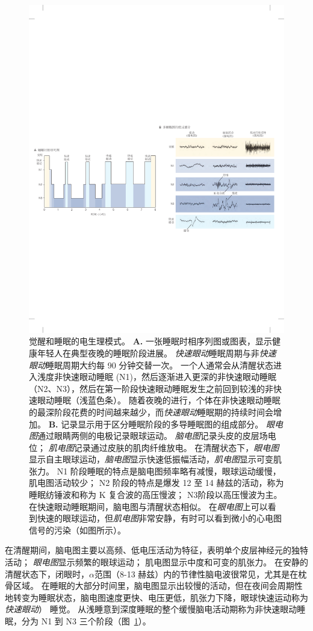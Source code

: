 \begin{figure}[htbp]
	\centering
	\includegraphics[width=0.7\linewidth]{chap44/fig_44_1}
	\caption{觉醒和睡眠的电生理模式。
		\textbf{A.} 一张睡眠时相序列图或图表，显示健康年轻人在典型夜晚的睡眠阶段进展。
		\textit{快速眼动}睡眠周期与非\textit{快速眼动}睡眠周期大约每 90 分钟交替一次。
		一个人通常会从清醒状态进入浅度非快速眼动睡眠 (N1)，然后逐渐进入更深的非快速眼动睡眠（N2、N3），然后在第一阶段快速眼动睡眠发生之前回到较浅的非快速眼动睡眠（浅蓝色条）。
		随着夜晚的进行，个体在非快速眼动睡眠的最深阶段花费的时间越来越少，而\textit{快速眼动}睡眠期的持续时间会增加。
		\textbf{B.} 记录显示用于区分睡眠阶段的多导睡眠图的组成部分。
		\textit{眼电图}通过眼睛两侧的电极记录眼球运动。
		\textit{脑电图}记录头皮的皮层场电位； \textit{肌电图}记录通过皮肤的肌肉纤维放电。
		在清醒状态下，\textit{眼电图}显示自主眼球运动，\textit{脑电图}显示快速低振幅活动，\textit{肌电图}显示可变肌张力。
		N1 阶段睡眠的特点是脑电图频率略有减慢，眼球运动缓慢，肌电图活动较少；
		N2 阶段的特点是爆发 12 至 14 赫兹的活动，称为睡眠纺锤波和称为 K 复合波的高压慢波；
		N3阶段以高压慢波为主。
		在快速眼动睡眠期间，脑电图与清醒状态相似。
		在\textit{眼电图}上可以看到快速的眼球运动，但\textit{肌电图}非常安静，有时可以看到微小的心电图信号的污染（如图所示）。}
	\label{fig:44_1}
\end{figure}


在清醒期间，脑电图主要以高频、低电压活动为特征，表明单个皮层神经元的独特活动；
\textit{眼电图}显示频繁的眼球运动；
肌电图显示中度和可变的肌张力。
在安静的清醒状态下，闭眼时，$ \alpha $范围（8-13 赫兹）内的节律性脑电波很常见，尤其是在枕骨区域。
在睡眠的大部分时间里，脑电图显示出较慢的活动，但在夜间会周期性地转变为睡眠状态，脑电图速度更快、电压更低，肌张力下降，眼球快速运动称为\textit{快速眼动}） 睡觉。
从浅睡意到深度睡眠的整个缓慢脑电活动期称为非快速眼动睡眠，分为 N1 到 N3 三个阶段（图~\ref{fig:44_1}）。



